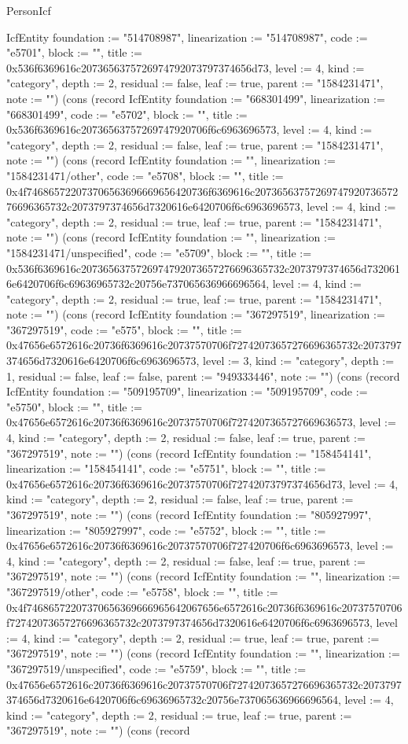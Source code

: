 \begin{lexlean}{PersonIcf}
\begin{semanticmodule}
{IcfEntity {foundation := "514708987", linearization := "514708987", code := "e5701", block := "", title := 0x536f6369616c2073656375726974792073797374656d73, level := 4, kind := "category", depth := 2, residual := false, leaf := true, parent := "1584231471", note := ""}) (cons (record IcfEntity {foundation := "668301499", linearization := "668301499", code := "e5702", block := "", title := 0x536f6369616c20736563757269747920706f6c6963696573, level := 4, kind := "category", depth := 2, residual := false, leaf := true, parent := "1584231471", note := ""}) (cons (record IcfEntity {foundation := "", linearization := "1584231471/other", code := "e5708", block := "", title := 0x4f746865722073706563696669656420736f6369616c2073656375726974792073657276696365732c2073797374656d7320616e6420706f6c6963696573, level := 4, kind := "category", depth := 2, residual := true, leaf := true, parent := "1584231471", note := ""}) (cons (record IcfEntity {foundation := "", linearization := "1584231471/unspecified", code := "e5709", block := "", title := 0x536f6369616c2073656375726974792073657276696365732c2073797374656d7320616e6420706f6c69636965732c20756e737065636966696564, level := 4, kind := "category", depth := 2, residual := true, leaf := true, parent := "1584231471", note := ""}) (cons (record IcfEntity {foundation := "367297519", linearization := "367297519", code := "e575", block := "", title := 0x47656e6572616c20736f6369616c20737570706f72742073657276696365732c2073797374656d7320616e6420706f6c6963696573, level := 3, kind := "category", depth := 1, residual := false, leaf := false, parent := "949333446", note := ""}) (cons (record IcfEntity {foundation := "509195709", linearization := "509195709", code := "e5750", block := "", title := 0x47656e6572616c20736f6369616c20737570706f7274207365727669636573, level := 4, kind := "category", depth := 2, residual := false, leaf := true, parent := "367297519", note := ""}) (cons (record IcfEntity {foundation := "158454141", linearization := "158454141", code := "e5751", block := "", title := 0x47656e6572616c20736f6369616c20737570706f72742073797374656d73, level := 4, kind := "category", depth := 2, residual := false, leaf := true, parent := "367297519", note := ""}) (cons (record IcfEntity {foundation := "805927997", linearization := "805927997", code := "e5752", block := "", title := 0x47656e6572616c20736f6369616c20737570706f727420706f6c6963696573, level := 4, kind := "category", depth := 2, residual := false, leaf := true, parent := "367297519", note := ""}) (cons (record IcfEntity {foundation := "", linearization := "367297519/other", code := "e5758", block := "", title := 0x4f74686572207370656369666965642067656e6572616c20736f6369616c20737570706f72742073657276696365732c2073797374656d7320616e6420706f6c6963696573, level := 4, kind := "category", depth := 2, residual := true, leaf := true, parent := "367297519", note := ""}) (cons (record IcfEntity {foundation := "", linearization := "367297519/unspecified", code := "e5759", block := "", title := 0x47656e6572616c20736f6369616c20737570706f72742073657276696365732c2073797374656d7320616e6420706f6c69636965732c20756e737065636966696564, level := 4, kind := "category", depth := 2, residual := true, leaf := true, parent := "367297519", note := ""}) (cons (record }
\end{semanticmodule}
\end{lexlean}
